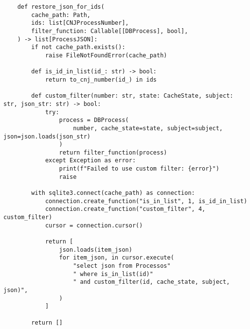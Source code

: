 \begin{listing}[htb]
    \tiny
    \centering
    \begin{verbatim}
    def restore_json_for_ids(
        cache_path: Path,
        ids: list[CNJProcessNumber],
        filter_function: Callable[[DBProcess], bool],
    ) -> list[ProcessJSON]:
        if not cache_path.exists():
            raise FileNotFoundError(cache_path)

        def is_id_in_list(id_: str) -> bool:
            return to_cnj_number(id_) in ids

        def custom_filter(number: str, state: CacheState, subject: str, json_str: str) -> bool:
            try:
                process = DBProcess(
                    number, cache_state=state, subject=subject, json=json.loads(json_str)
                )
                return filter_function(process)
            except Exception as error:
                print(f"Failed to use custom filter: {error}")
                raise

        with sqlite3.connect(cache_path) as connection:
            connection.create_function("is_in_list", 1, is_id_in_list)
            connection.create_function("custom_filter", 4, custom_filter)
            cursor = connection.cursor()

            return [
                json.loads(item_json)
                for item_json, in cursor.execute(
                    "select json from Processos"
                    " where is_in_list(id)"
                    " and custom_filter(id, cache_state, subject, json)",
                )
            ]

        return []
    \end{verbatim}
    \caption{%
        Reprodução do código de restauração dos dados de processos da
        \textit{cache} a partir de filtros personalizados.
    }
    \label{cod:restauração-dados-processos-cache}
\end{listing}

%
%
